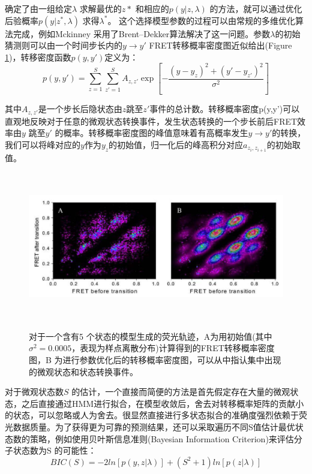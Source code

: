 \documentclass[11pt, a4paper]{article}
\begin{document}
确定了由一组给定$\lambda$ 求解最优的$z*$ 和相应的$p(y|z,\lambda)$ 的方法，就可以通过优化后验概率$p(y|z^*,\lambda)$ 求得$\lambda^*$。 这个选择模型参数的过程可以由常规的多维优化算法完成，例如Mckinney 采用了Brent–Dekker算法解决了这一问题\cite{Brent}。参数$\lambda$的初始猜测则可以由一个时间步长内的$y\rightarrow y'$ FRET转移概率密度图近似给出(Figure \ref{fig:tdp})，转移密度函数$p(y,y')$定义为：
\begin{equation}
p(y,y')=\sum_{z=1}^S \sum_{z'=1}^S A_{z, z'} \exp\left[-\frac{(y- y_{z})^2+(y'- y_{z'})^2}{\sigma^2}\right]
\end{equation}

其中$A_{z,z'}$是一个步长后隐状态由$z$跳至$z'$事件的总计数。转移概率密度p(y,y')可以直观地反映对于任意的微观状态转换事件，发生状态转换的一个步长前后FRET效率由$y$ 跳至$y'$ 的概率。转移概率密度图的峰值意味着有高概率发生$y\rightarrow y'$的转换，我们可以将峰对应的$y$作为$y_z$的初始值，归一化后的峰高积分对应$a_{z_{i}, z_{i+1}}$的初始取值。

\begin{figure}[htb]
  \centering
  \includegraphics[height=6.5cm]{Fig_tdp.PNG}\\
  \caption{对于一个含有5 个状态的模型生成的荧光轨迹，A为用初始值(其中$\sigma^2=0.0005$，表现为样点离散分布)计算得到的FRET转移概率密度图，B 为进行参数优化后的转移概率密度图，可以从中指认集中出现的微观状态和状态转换事件。}
  \label{fig:tdp}
\end{figure}


对于微观状态数$S$ 的估计，一个直接而简便的方法是首先假定存在大量的微观状态，之后直接通过HMM进行拟合，在模型收敛后，舍去对转移概率矩阵的贡献小的状态，可以忽略或人为舍去。很显然直接进行多状态拟合的准确度强烈依赖于荧光数据质量。为了获得更为可靠的预测结果，还可以采取遍历不同S值估计最优状态数的策略，例如使用贝叶斯信息准则(Bayesian Information Criterion)来评估分子状态数为S 的可能性：
\begin{equation}
BIC(S)=-2ln[p(y,z|\lambda)]+(S^2+1)ln[p(z|\lambda)]
\end{equation}
\end{document}
